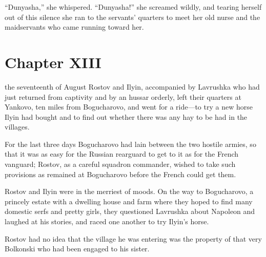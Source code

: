``Dunyasha,'' she whispered. ``Dunyasha!'' she screamed wildly,
and tearing herself out of this silence she ran to the servants'
quarters to meet her old nurse and the maidservants who came
running toward her.


\chapter*{Chapter XIII} \ifaudio {}
\fi

 the seventeenth of August Rostov and Ilyin, accompanied by
Lavrushka who had just returned from captivity and by an hussar
orderly, left their quarters at Yankovo, ten miles from
Bogucharovo, and went for a ride---to try a new horse Ilyin had
bought and to find out whether there was any hay to be had in the
villages.

For the last three days Bogucharovo had lain between the two
hostile armies, so that it was as easy for the Russian rearguard
to get to it as for the French vanguard; Rostov, as a careful
squadron commander, wished to take such provisions as remained at
Bogucharovo before the French could get them.

Rostov and Ilyin were in the merriest of moods. On the way to
Bogucharovo, a princely estate with a dwelling house and farm
where they hoped to find many domestic serfs and pretty girls,
they questioned Lavrushka about Napoleon and laughed at his
stories, and raced one another to try Ilyin's horse.

Rostov had no idea that the village he was entering was the
property of that very Bolkonski who had been engaged to his
sister.

